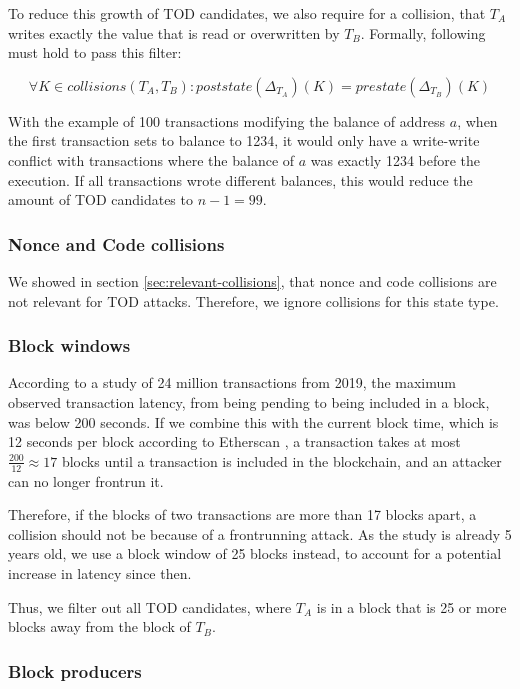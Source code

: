 \documentclass[draft,final]{vutinfth} %
\begin{document}
To reduce this growth of TOD candidates, we also require for a collision, that $T_A$ writes exactly the value that is read or overwritten by $T_B$. Formally, following must hold to pass this filter:

$$\forall K \in collisions(T_A, T_B)\colon poststate(\Delta_{T_A})(K) = prestate(\Delta_{T_B})(K)$$

With the example of 100 transactions modifying the balance of address $a$, when the first transaction sets to balance to 1234, it would only have a write-write conflict with transactions where the balance of $a$ was exactly 1234 before the execution. If all transactions wrote different balances, this would reduce the amount of TOD candidates to $n-1 = 99$.

\subsubsection{Nonce and Code collisions}

We showed in section \ref{sec:relevant-collisions}, that nonce and code collisions are not relevant for TOD attacks. Therefore, we ignore collisions for this state type.

\subsubsection{Block windows}


According to a study of 24 million transactions from 2019, the maximum observed transaction latency, from being pending to being included in a block, was below 200 seconds. If we combine this with the current block time, which is 12 seconds per block according to Etherscan \cite{etherscanio_ethereum_2024}, a transaction takes at most $\frac{200}{12} \approx 17$ blocks until a transaction is included in the blockchain, and an attacker can no longer frontrun it.

Therefore, if the blocks of two transactions are more than 17 blocks apart, a collision should not be because of a frontrunning attack. As the study is already 5 years old, we use a block window of 25 blocks instead, to account for a potential increase in latency since then.

Thus, we filter out all TOD candidates, where $T_A$ is in a block that is 25 or more blocks away from the block of $T_B$.

\subsubsection{Block producers}
\end{document}
